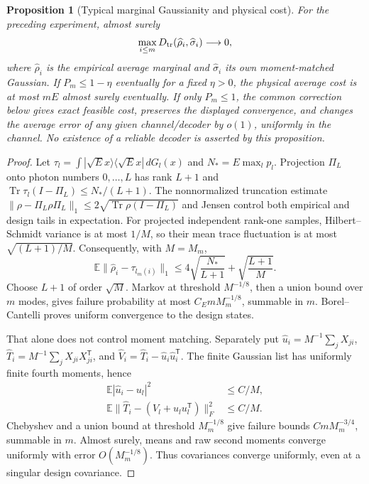 \documentclass[11pt]{article}
\newtheorem{proposition}[theorem]{Proposition}
\newcommand{\E}{\mathbb E}
\newcommand{\Tr}{\operatorname{Tr}}
\begin{document}
\begin{proposition}[Typical marginal Gaussianity and physical cost]
\label{prop:typical}
For the preceding experiment, almost surely
\[
 \max_{i\leq m}D_{\rm tr}(\widehat\rho_i,
                \widehat\sigma_i)\longrightarrow0,
\]
where \(\widehat\rho_i\) is the empirical average marginal and
\(\widehat\sigma_i\) its own moment-matched Gaussian.
If \(P_m\leq1-\eta\) eventually for a fixed \(\eta>0\), the physical
average cost is at most \(mE\) almost surely eventually.
If only \(P_m\leq1\), the common correction below gives exact feasible
cost, preserves the displayed convergence, and changes the average error
of any given channel/decoder by \(o(1)\), uniformly in the channel.
No existence of a reliable decoder is asserted by this proposition.
\end{proposition}
\begin{proof}
Let \(\tau_l=\int|\sqrt E x\rangle\langle\sqrt E x|\,dG_l(x)\)
and \(N_*=E\max_l p_l\). Projection \(\Pi_L\) onto photon numbers
\(0,\ldots,L\) has rank \(L+1\) and
\(\Tr\tau_l(I-\Pi_L)\leq N_* /(L+1)\).
The nonnormalized truncation estimate
\(\|\rho-\Pi_L\rho\Pi_L\|_1\leq2\sqrt{\Tr\rho(I-\Pi_L)}\)
and Jensen control both empirical and design tails in expectation.
For projected independent rank-one samples, Hilbert--Schmidt variance
is at most \(1/M\), so their mean trace fluctuation is at most
\(\sqrt{(L+1)/M}\). Consequently, with \(M=M_m\),
\[
 \E\|\widehat\rho_i-\tau_{l_m(i)}\|_1
 \leq4\sqrt{\frac{N_*}{L+1}}+\sqrt{\frac{L+1}{M}}.
\]
Choose \(L+1\) of order \(\sqrt M\). Markov at threshold
\(M^{-1/8}\), then a union bound over \(m\) modes, gives failure
probability at most \(C_E mM_m^{-1/8}\), summable in \(m\).
Borel--Cantelli proves uniform convergence to the design states.

That alone does not control moment matching. Separately put
\(\widehat u_i=M^{-1}\sum_jX_{ji}\),
\(\widehat T_i=M^{-1}\sum_jX_{ji}X_{ji}^{\mathsf T}\), and
\(\widehat V_i=\widehat T_i-\widehat u_i\widehat u_i^{\mathsf T}\).
The finite Gaussian list has uniformly finite fourth moments, hence
\[
 \begin{aligned}
 \E|\widehat u_i-u_l|^2&\leq C/M,\\
 \E\|\widehat T_i-(V_l+u_lu_l^{\mathsf T})\|_F^2&\leq C/M.
 \end{aligned}
\]
Chebyshev and a union bound at threshold \(M_m^{-1/8}\) give failure
bounds \(CmM_m^{-3/4}\), summable in \(m\). Almost surely, means and raw
second moments converge uniformly with error \(O(M_m^{-1/8})\).
Thus covariances converge uniformly, even at a singular design covariance.


\end{proof}
\end{document}
